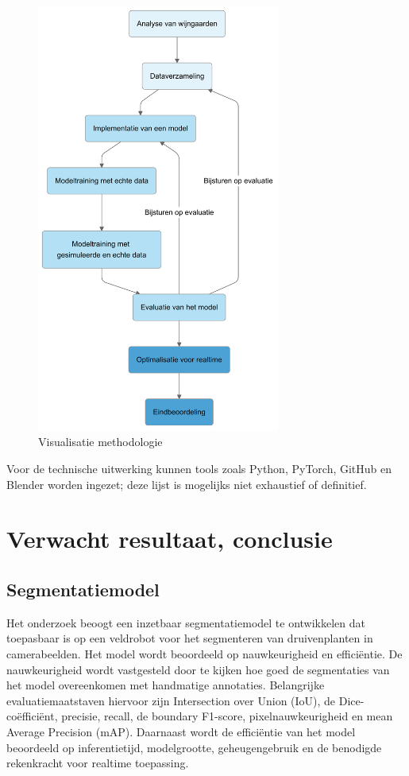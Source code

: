 \begin{figure}[h]
    \includegraphics[width=8cm]{img/verloop.png}
    \caption{Visualisatie methodologie}
    \label{fig:met}
\end{figure}

Voor de technische uitwerking kunnen tools zoals Python, PyTorch, GitHub en Blender worden ingezet; deze lijst is mogelijks niet exhaustief of definitief.

\section{Verwacht resultaat, conclusie}%
\label{sec:verwachte_resultaten}

\subsection{Segmentatiemodel}
Het onderzoek beoogt een inzetbaar segmentatiemodel te ontwikkelen dat toepasbaar is op een veldrobot voor het segmenteren van druivenplanten in camerabeelden. Het model wordt beoordeeld op nauwkeurigheid en efficiëntie. De nauwkeurigheid wordt vastgesteld door te kijken hoe goed de segmentaties van het model overeenkomen met handmatige annotaties. Belangrijke evaluatiemaatstaven hiervoor zijn Intersection over Union (IoU), de Dice-coëfficiënt, precisie, recall, de boundary F1-score, pixelnauwkeurigheid en mean Average Precision (mAP). Daarnaast wordt de efficiëntie van het model beoordeeld op inferentietijd, modelgrootte, geheugengebruik en de benodigde rekenkracht voor realtime toepassing.

